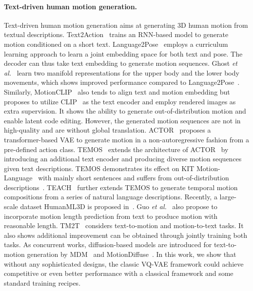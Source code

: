 \documentclass[10pt,twocolumn,letterpaper]{article}
\begin{document}
\paragraph{Text-driven human motion generation.} Text-driven human motion generation aims at generating 3D human motion from textual descriptions. Text2Action~\cite{ahn2018text2action} trains
an RNN-based model to generate motion conditioned on a short text. Language2Pose~\cite{ahuja2019language2pose} employs a curriculum learning approach to learn a joint embedding space for both text and pose. The decoder can thus take text embedding to generate motion sequences. Ghost \textit{et al.}~\cite{ghosh2021synthesis} learn two manifold representations for the upper body and the lower body movements, which shows improved performance compared to Language2Pose~\cite{ahuja2019language2pose}. Similarly, MotionCLIP~\cite{tevet2022motionclip} also tends to align text and motion embedding but proposes to utilize CLIP~\cite{radford2021learning} as the text encoder and employ rendered images as extra supervision. It shows the ability to generate out-of-distribution motion and enable latent code editing. However, the generated motion sequences are not in high-quality and are without global translation. ACTOR~\cite{petrovich21actor} proposes a transformer-based VAE to generate motion in a non-autoregressive fashion from a pre-defined action class. TEMOS~\cite{petrovich22temos} extends the architecture of ACTOR~\cite{petrovich21actor} by introducing an additional text encoder and producing diverse motion sequences given text descriptions. TEMOS demonstrates its effect on KIT Motion-Language~\cite{plappert2016kit} with mainly short sentences and suffers from out-of-distribution descriptions~\cite{petrovich22temos}. TEACH~\cite{TEACH:3DV:2022} further extends TEMOS to generate temporal motion compositions from a series of natural language descriptions. Recently, a large-scale dataset HumanML3D is proposed in~\cite{guo2022generating}. Guo \textit{et al.}~\cite{guo2022generating} also propose to incorporate motion length prediction from text to produce motion with reasonable length. TM2T~\cite{chuan2022tm2t} considers text-to-motion and motion-to-text tasks. It also shows additional improvement can be obtained through jointly training both tasks. As concurrent works, diffusion-based models are introduced for text-to-motion generation by MDM~\cite{tevet2022MDM} and MotionDiffuse~\cite{zhang2022motiondiffuse}. In this work, we show that without any sophisticated designs, the classic VQ-VAE framework could achieve competitive or even better performance with a classical framework and some standard training recipes. 
\end{document}
